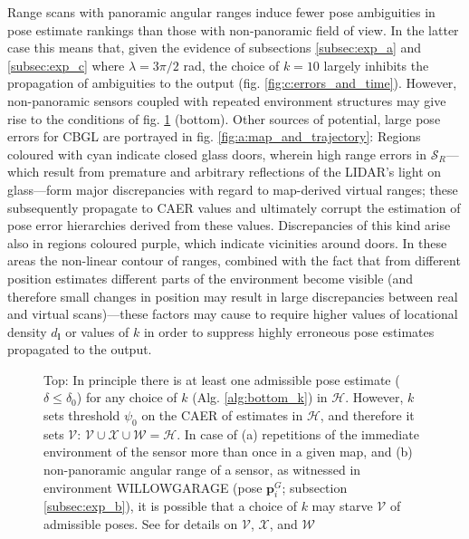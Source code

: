 Range scans with panoramic angular ranges induce fewer pose ambiguities in pose
estimate rankings than those with non-panoramic field of view. In the latter
case this means that, given the evidence of subsections \ref{subsec:exp_a} and
\ref{subsec:exp_c} where $\lambda = 3\pi/2$ rad, the choice of $k=10$ largely
inhibits the propagation of ambiguities to the output (fig.
\ref{fig:c:errors_and_time}).  However, non-panoramic sensors coupled with
repeated environment structures may give rise to the conditions of fig.
\ref{fig:h_and_h_not_fig} (bottom). Other sources of potential, large pose
errors for CBGL are portrayed in fig. \ref{fig:a:map_and_trajectory}:
Regions coloured with cyan indicate closed glass doors, wherein high range
errors in $\mathcal{S}_R$---which result from premature and arbitrary
reflections of the LIDAR's light on glass---form major discrepancies with
regard to map-derived virtual ranges; these subsequently propagate to CAER
values and ultimately corrupt the estimation of pose error hierarchies derived
from these values.  Discrepancies of this kind arise also in regions coloured
purple, which indicate vicinities around doors. In these areas the non-linear
contour of ranges, combined with the fact that from different position
estimates different parts of the environment become visible (and therefore
small changes in position may result in large discrepancies between real and
virtual scans)---these factors may cause to require higher values of locational
density $d_{\bm{l}}$ or values of $k$ in order to suppress highly erroneous
pose estimates propagated to the output.

\begin{figure}
  
  \vspace{0.3cm}
  \caption{\small Top: In principle there is at least one admissible pose
           estimate ($\delta \leq \delta_0$) for any choice of $k$ (Alg.
           \ref{alg:bottom_k}) in $\mathcal{H}$. However, $k$ sets threshold
           $\psi_0$ on the CAER of estimates in $\mathcal{H}$, and therefore it
           sets $\mathcal{V}$: $\mathcal{V} \cup \mathcal{X} \cup \mathcal{W} =
           \mathcal{H}$.  In case of (a) repetitions of the immediate
           environment of the sensor more than once in a given map, and (b)
           non-panoramic angular range of a sensor, as witnessed in environment
           WILLOWGARAGE (pose $\bm{p}_{i}^G$; subsection \ref{subsec:exp_b}),
           it is possible that a choice of $k$ may starve $\mathcal{V}$ of
           admissible poses. See \cite{cbglarxiv} for details on $\mathcal{V}$,
           $\mathcal{X}$, and $\mathcal{W}$
        }
        \vspace{-0.5cm}
  \label{fig:h_and_h_not_fig}
\end{figure}
